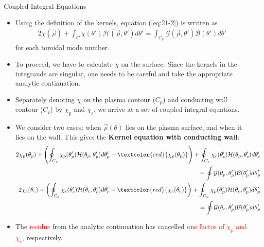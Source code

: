 \documentclass[8pt]{beamer}
\begin{document}
\begin{frame}{\color{white} Coupled Integral Equations}
\begin{itemize}
    \item Using the definition of the kernels, equation (\ref{eq:21-2}) is written as
    \begin{align}
         2\chi(\vec{\rho}) + \int_C \chi(\theta')\mathcal{H}(\vec{\rho}, \theta')d\theta' = \int_{C_p} \mathcal{G}(\vec{\rho}, \theta')\mathcal{B}(\theta')d\theta' \label{eq:22}
    \end{align}
    for each toroidal mode number.
    \item To proceed, we have to calculate $\chi$ on the surface. Since the kernels in the integrands are singular, one needs to be careful and take the appropriate analytic continuation.
    \item Separately denoting $\chi$ on the plasma contour ($C_p$) and conducting wall contour ($C_c$) by $\chi_p$ and $\chi_c$, we arrive at a set of coupled integral equations.
    \item We consider two cases: when $\vec{\rho}(\theta)$ lies on the plasma surface, and when it lies on the wall. This gives the \textbf{Kernel equation with conducting wall}:
    \begin{align}
         2\chi_p(\theta_p) + \left( \oint_{C_p} \chi_p(\theta'_p) \mathcal{H}(\theta_p, \theta'_p) d\theta'_p - \textcolor{red}{\chi_p(\theta_p)} \right)
         +  \oint_{C_c} \chi_c(\theta'_c) \mathcal{H}(\theta_p, \theta'_c) d\theta'_c  \nonumber\\
         = \oint \mathcal{G}(\theta_p, \theta'_p) \mathcal{B}(\theta'_p) d\theta'_p \label{eq:26}\\ 
         2\chi_c(\theta_c) + \left( \oint_{C_c} \chi_c(\theta'_c) \mathcal{H}(\theta_c, \theta'_c) d\theta'_c - \textcolor{red}{\chi_c(\theta_c)} \right)
         + \oint_{C_p} \chi_p(\theta'_p) \mathcal{H}(\theta_c, \theta'_p) d\theta'_p \nonumber\\
         = \oint \mathcal{G}(\theta_c, \theta'_p) \mathcal{B}(\theta'_p) d\theta'_p \label{eq:27}
    \end{align}
    \item The \textcolor{red}{residue} from the analytic continuation has cancelled \textcolor{red}{one factor of $\chi_p$ and $\chi_c$}, respectively.
\end{itemize}
\end{frame}
\end{document}
